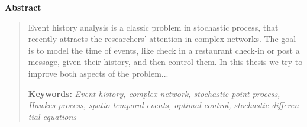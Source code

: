 \thispagestyle{empty} 

\begin{latin}
\centerline{\textbf{\large{Abstract}}}
\begin{quote}
\small

Event history analysis is a classic problem in stochastic process, that  recently attracts the researchers' attention in complex networks. The goal is to model the time of events, like check in a restaurant check-in or post a message, given their history, and then control them. In this thesis we try to improve both aspects of the problem...


\vskip 0.3cm
\textbf{Keywords:} \textit{Event history, complex network, stochastic point process, Hawkes process, spatio-temporal events, optimal control, stochastic differential equations}
\end{quote}
\end{latin}


